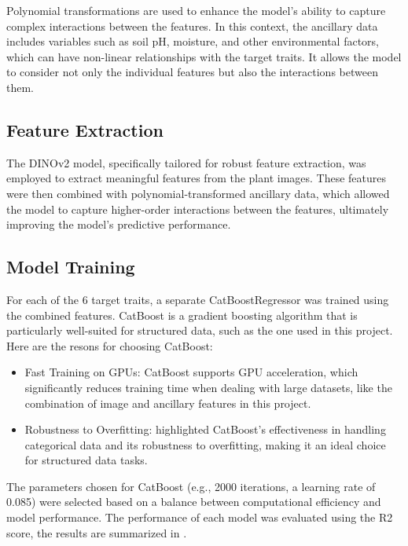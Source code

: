 \documentclass{article}
\begin{document}
Polynomial transformations are used to enhance the model's ability to capture complex interactions between the features. In this context, the ancillary data includes variables such as soil pH, moisture, and other environmental factors, which can have non-linear relationships with the target traits. It allows the model to consider not only the individual features but also the interactions between them.

\subsection{Feature Extraction}
The DINOv2 model, specifically tailored for robust feature extraction, was employed to extract meaningful features from the plant images. These features were then combined with polynomial-transformed ancillary data, which allowed the model to capture higher-order interactions between the features, ultimately improving the model's predictive performance.

\subsection{Model Training}
For each of the 6 target traits, a separate CatBoostRegressor was trained using the combined features. CatBoost is a gradient boosting algorithm that is particularly well-suited for structured data, such as the one used in this project. Here are the resons for choosing CatBoost:

\begin{itemize}
	\item Fast Training on GPUs: CatBoost supports GPU acceleration, which significantly reduces training time when dealing with large datasets, like the combination of image and ancillary features in this project.
	\item Robustness to Overfitting: \citet{CatBoost} highlighted CatBoost's effectiveness in handling categorical data and its robustness to overfitting, making it an ideal choice for structured data tasks.
\end{itemize}

The parameters chosen for CatBoost (e.g., 2000 iterations, a learning rate of 0.085) were selected based on a balance between computational efficiency and model performance. The performance of each model was evaluated using the R2 score, the results are summarized in .
\end{document}
